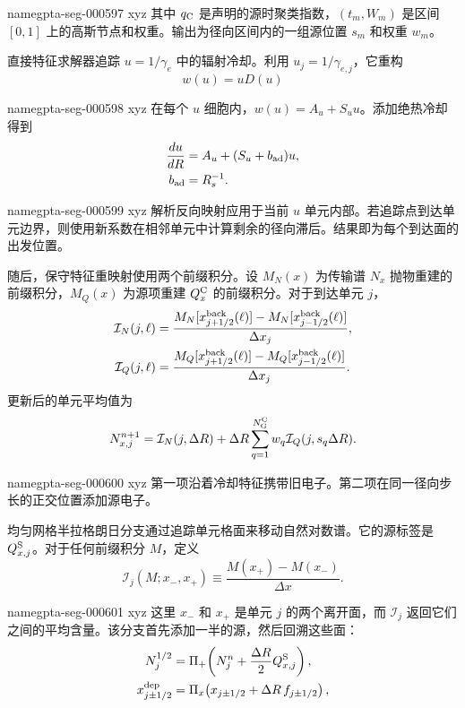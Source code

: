 \documentclass[twocolumn]{aastex702}
\makeatletter
\providecommand{\gptareaderanchor}[1]{\pdfdest name{#1} xyz}%
\providecommand{\gptareaderanchor}[1]{\special{pdf:dest (#1) [ @thispage /XYZ @xpos @ypos null ]}}%
\makeatother
\begin{document}
\gptareaderanchor{gpta-seg-000597}%
其中 \(q_{\rm C}\) 是声明的源时聚类指数，\((t_m,W_m)\) 是区间 \([0,1]\) 上的高斯节点和权重。输出为径向区间内的一组源位置 \(s_m\) 和权重 \(w_m\)。

直接特征求解器追踪 \(u=1/\gamma_e\) 中的辐射冷却。利用 \(u_j=1/\gamma_{e,j}\)，它重构
\begin{equation}
w(u)=uD(u)
\end{equation}

\gptareaderanchor{gpta-seg-000598}%
在每个 \(u\) 细胞内，\(w(u)=A_u+S_u u\)。添加绝热冷却得到
\begin{equation}
\begin{aligned}
\frac{du}{dR}&=A_u+(S_u+b_{\rm ad})u,\\
b_{\rm ad}&=R_s^{-1}.
\end{aligned}
\end{equation}

\gptareaderanchor{gpta-seg-000599}%
解析反向映射应用于当前 \(u\) 单元内部。若追踪点到达单元边界，则使用新系数在相邻单元中计算剩余的径向滞后。结果即为每个到达面的出发位置。

随后，保守特征重映射使用两个前缀积分。设 \(M_N(x)\) 为传输谱 \(N_x\) 抛物重建的前缀积分，\(M_Q(x)\) 为源项重建 \(Q_x^{\rm C}\) 的前缀积分。对于到达单元 \(j\)，
\begin{equation}
\begin{aligned}
{\cal I}_N(j,\ell)&=
\frac{M_N[x_{j+1/2}^{\rm back}(\ell)]
-M_N[x_{j-1/2}^{\rm back}(\ell)]}{\Delta x_j},\\
{\cal I}_Q(j,\ell)&=
\frac{M_Q[x_{j+1/2}^{\rm back}(\ell)]
-M_Q[x_{j-1/2}^{\rm back}(\ell)]}{\Delta x_j}.
\end{aligned}
\end{equation}
更新后的单元平均值为
\begin{equation}
N_{x,j}^{n+1}={\cal I}_N(j,\Delta R)
+\Delta R\sum_{q=1}^{N_{\rm G}^{\rm C}}w_q{\cal I}_Q(j,s_q\Delta R).
\end{equation}

\gptareaderanchor{gpta-seg-000600}%
第一项沿着冷却特征携带旧电子。第二项在同一径向步长的正交位置添加源电子。

均匀网格半拉格朗日分支通过追踪单元格面来移动自然对数谱。它的源标签是 \(Q_{x,j}^{\rm S}\)。对于任何前缀积分 \(M\)，定义
\begin{equation}
\mathcal I_j(M;x_-,x_+)\equiv\frac{M(x_+)-M(x_-)}{\Delta x}.
\end{equation}

\gptareaderanchor{gpta-seg-000601}%
这里 \(x_-\) 和 \(x_+\) 是单元 \(j\) 的两个离开面，而 \(\mathcal I_j\) 返回它们之间的平均含量。该分支首先添加一半的源，然后回溯这些面：
\begin{equation}
\begin{aligned}
N_j^{1/2}&=\Pi_+\!\left(N_j^n+\frac{\Delta R}{2}Q_{x,j}^{\rm S}\right),\\
x_{j\pm1/2}^{\rm dep}
&=\Pi_x\!\left(x_{j\pm1/2}+\Delta R\,f_{j\pm1/2}\right),
\end{aligned}
\end{equation}
\end{document}
